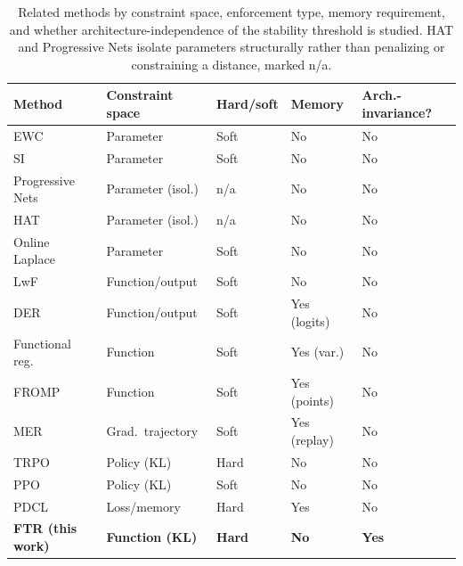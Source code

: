 \documentclass[11pt]{article}
\begin{document}
\begin{table}[h]
\centering
\caption{Related methods by constraint space, enforcement type, memory
requirement, and whether architecture-independence of the stability
threshold is studied. HAT and Progressive Nets isolate parameters
structurally rather than penalizing or constraining a distance, marked
n/a.}
\label{tab:relatedwork}
\footnotesize
\begin{tabular}{lllll}
\toprule
Method & Constraint space & Hard/soft & Memory & Arch.-invariance? \\
\midrule
EWC \citep{kirkpatrick2017overcoming} & Parameter & Soft & No & No \\
SI \citep{zenke2017continual} & Parameter & Soft & No & No \\
Progressive Nets \citep{rusu2016progressive} & Parameter (isol.) & n/a & No & No \\
HAT \citep{serra2018overcoming} & Parameter (isol.) & n/a & No & No \\
Online Laplace \citep{ritter2018online} & Parameter & Soft & No & No \\
LwF \citep{li2017learning} & Function/output & Soft & No & No \\
DER \citep{buzzega2020dark} & Function/output & Soft & Yes (logits) & No \\
Functional reg.\ \citep{titsias2020functional} & Function & Soft & Yes (var.) & No \\
FROMP \citep{pan2020continual} & Function & Soft & Yes (points) & No \\
MER \citep{riemer2019learning} & Grad.\ trajectory & Soft & Yes (replay) & No \\
TRPO \citep{schulman2015trust} & Policy (KL) & Hard & No & No \\
PPO \citep{schulman2017proximal} & Policy (KL) & Soft & No & No \\
PDCL \citep{elenter2023primal} & Loss/memory & Hard & Yes & No \\
\textbf{FTR (this work)} & \textbf{Function (KL)} & \textbf{Hard} & \textbf{No} & \textbf{Yes} \\
\bottomrule
\end{tabular}
\end{table}
\end{document}
